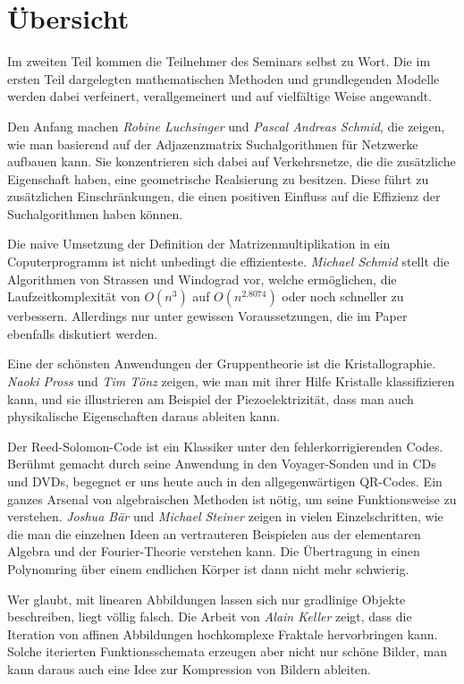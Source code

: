 %
%
%
\chapter*{Übersicht}
\rhead{}
\label{buch:uebersicht}
Im zweiten Teil kommen die Teilnehmer des Seminars selbst zu Wort.
Die im ersten Teil dargelegten mathematischen Methoden und
grundlegenden Modelle werden dabei verfeinert, verallgemeinert
und auf vielfältige Weise angewandt.

Den Anfang machen {\em Robine Luchsinger} und {\em Pascal Andreas Schmid},
die zeigen, wie man basierend auf der Adjazenzmatrix Suchalgorithmen
für Netzwerke aufbauen kann.
Sie konzentrieren sich dabei auf Verkehrsnetze, die die zusätzliche
Eigenschaft haben, eine geometrische Realsierung zu besitzen.
Diese führt zu zusätzlichen Einschränkungen, die einen positiven
Einfluss auf die Effizienz der Suchalgorithmen haben können.

Die naive Umsetzung der Definition der Matrizenmultiplikation in
ein Coputerprogramm ist nicht unbedingt die effizienteste.
{\em Michael Schmid} stellt die Algorithmen von Strassen und
Windograd vor, welche ermöglichen, die Laufzeitkomplexität
von $O(n^3)$ auf $O(n^{2.8074})$ oder noch schneller zu verbessern.
Allerdings nur unter gewissen Voraussetzungen, die im Paper
ebenfalls diskutiert werden.

Eine der schönsten Anwendungen der Gruppentheorie ist die
Kristallographie.
{\em Naoki Pross} und {\em Tim Tönz} zeigen, wie man mit ihrer
Hilfe Kristalle klassifizieren kann, und sie illustrieren am Beispiel
der Piezoelektrizität, dass man auch physikalische Eigenschaften daraus
ableiten kann.

Der Reed-Solomon-Code ist ein Klassiker unter den fehlerkorrigierenden
Codes.
Berühmt gemacht durch seine Anwendung in den Voyager-Sonden und in CDs
und DVDs, begegnet er uns heute auch in den allgegenwärtigen QR-Codes.
Ein ganzes Arsenal von algebraischen Methoden ist nötig, um seine
Funktionsweise zu verstehen.
{\em Joshua Bär} und {\em Michael Steiner} zeigen in vielen Einzelschritten,
wie die man die einzelnen Ideen an vertrauteren Beispielen aus der
elementaren Algebra und der Fourier-Theorie verstehen kann.
Die Übertragung in einen Polynomring über einem endlichen Körper 
ist dann nicht mehr schwierig.

Wer glaubt, mit linearen Abbildungen lassen sich nur gradlinige
Objekte beschreiben, liegt völlig falsch.
Die Arbeit von {\em Alain Keller} zeigt, dass die Iteration von
affinen Abbildungen hochkomplexe Fraktale hervorbringen kann.
Solche iterierten Funktionsschemata erzeugen aber nicht nur schöne
Bilder, man kann daraus auch eine Idee zur Kompression von
Bildern ableiten.

